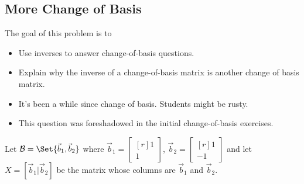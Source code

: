 \documentclass{problemset}
\newcommand{\mat}[1]{\begin{bmatrix*}[r]#1\end{bmatrix*}}
\begin{document}
\subsection*{More Change of Basis}
	\question
	\begin{annotation}
		\begin{goals}

			The goal of this problem is to
			\begin{itemize}
				\item Use inverses to answer change-of-basis questions.
				\item Explain why the inverse of a change-of-basis matrix is another
					change of basis matrix.
			\end{itemize}
		\end{goals}

		\begin{notes}
			\begin{itemize}
				\item It's been a while since change of basis. Students might be rusty.
				\item This question was foreshadowed in the initial change-of-basis exercises.
			\end{itemize}
		\end{notes}
	\end{annotation}
	Let $\mathcal B=\Set{\vec b_1,\vec b_2}$ where $\vec b_1=\mat{1\\1}$, $\vec b_2=\mat{1\\-1}$
	and let $X=[\vec b_1|\vec b_2]$ be the matrix whose columns are $\vec b_1$ and $\vec b_2$.
\end{document}
